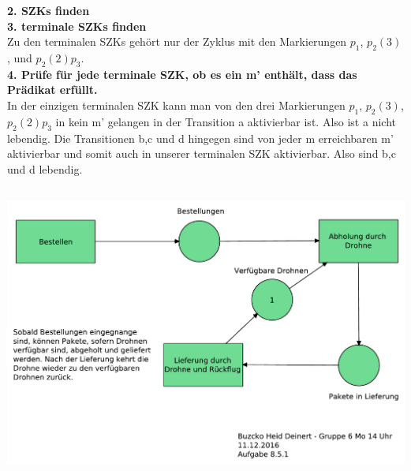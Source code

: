 \documentclass[a4paper,12pt]{scrartcl}
\begin{document}
\textbf{2. SZKs finden}\\
\textbf{3. terminale SZKs finden}\\
Zu den terminalen SZKs gehört nur der Zyklus mit den Markierungen $p_1$, $p_2 (3)$, und $p_2 (2)p_3$.\\
\textbf{4. Prüfe für jede terminale SZK, ob es ein m' enthält, dass das Prädikat erfüllt.} \\
In der einzigen terminalen SZK kann man von den drei Markierungen $p_1$, $p_2 (3)$,$p_2 (2)p_3$ in kein m' gelangen in der Transition a aktivierbar ist. Also ist a nicht lebendig. Die Transitionen b,c und d hingegen sind von jeder m erreichbaren m' aktivierbar und somit auch in unserer terminalen SZK aktivierbar. Also sind b,c und d lebendig.
\subsection{}
\includegraphics[scale=0.5]{G-6-A-8-Netz1-Buczko_Heid_Deinert.pdf}
\end{document}
